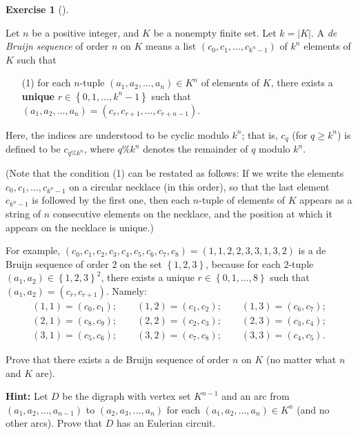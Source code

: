 \documentclass[numbers=enddot,12pt,final,onecolumn,notitlepage]{scrartcl}%
\newcounter{exer}
\theoremstyle{definition}
\newtheorem{exmp}[exer]{Exercise}
\newenvironment{exercise}[1][]
{\begin{exmp}[#1]\begin{leftbar}}
{\end{leftbar}\end{exmp}}
\newcommand{\set}[1]{\left\{ #1 \right\}}
\newcommand{\abs}[1]{\left| #1 \right|}
\newcommand{\tup}[1]{\left( #1 \right)}
\begin{document}
\begin{exercise} \label{exe.debruijn.1}
Let $n$ be a positive integer, and $K$ be a nonempty finite set.
Let $k = \abs{K}$.
A \textit{de Bruijn sequence} of order $n$ on $K$ means a list
$\tup{c_0, c_1, \ldots, c_{k^n-1}}$ of $k^n$ elements of $K$
such that

\begin{enumerate}
\item[(1)] for each
$n$-tuple $\tup{a_1, a_2, \ldots, a_n} \in K^n$ of elements of $K$,
there exists a \textbf{unique} $r \in \set{0, 1, \ldots, k^n-1}$ such
that
$\tup{a_1, a_2, \ldots, a_n} = \tup{c_r, c_{r+1}, \ldots, c_{r+n-1}}$.
\end{enumerate}

Here, the indices are understood to be cyclic modulo $k^n$; that is,
$c_q$ (for $q \geq k^n$) is defined to be $c_{q \% k^n}$, where
$q \% k^n$ denotes the remainder of $q$ modulo $k^n$.

(Note that the condition (1) can be restated as follows: If we
write the elements $c_0, c_1, \ldots, c_{k^n-1}$ on a circular
necklace (in this order), so that the last element $c_{k^n-1}$ is
followed by the first one, then each $n$-tuple of elements of $K$
appears as a string of $n$ consecutive elements on the necklace, and
the position at which it appears on the necklace is unique.)

For example, $\tup{c_0, c_1, c_2, c_3, c_4, c_5, c_6, c_7, c_8}
= \tup{1, 1, 2, 2, 3, 3, 1, 3, 2}$ is a de Bruijn sequence
of order $2$ on the set $\set{1, 2, 3}$, because for each $2$-tuple
$\tup{a_1, a_2} \in \set{1, 2, 3}^2$, there exists a unique $r \in \set{0, 1,
\ldots, 8}$ such that $\tup{a_1, a_2} = \tup{c_r, c_{r+1}}$. Namely:
\begin{align*}
\tup{1, 1} = \tup{c_0, c_1}; \qquad
\tup{1, 2} = \tup{c_1, c_2}; \qquad
\tup{1, 3} = \tup{c_6, c_7}; \\
\tup{2, 1} = \tup{c_8, c_9}; \qquad
\tup{2, 2} = \tup{c_2, c_3}; \qquad
\tup{2, 3} = \tup{c_3, c_4}; \\
\tup{3, 1} = \tup{c_5, c_6}; \qquad
\tup{3, 2} = \tup{c_7, c_8}; \qquad
\tup{3, 3} = \tup{c_4, c_5}.
\end{align*}

Prove that there exists a de Bruijn sequence of order $n$ on $K$
(no matter what $n$ and $K$ are).

\textbf{Hint:} Let $D$ be the digraph with vertex set $K^{n-1}$ and
an arc from $\tup{a_1, a_2, \ldots, a_{n-1}}$ to
$\tup{a_2, a_3, \ldots, a_n}$ for each
$\tup{a_1, a_2, \ldots, a_n} \in K^n$ (and no other arcs). Prove that
$D$ has an Eulerian circuit.
\end{exercise}
\end{document}

